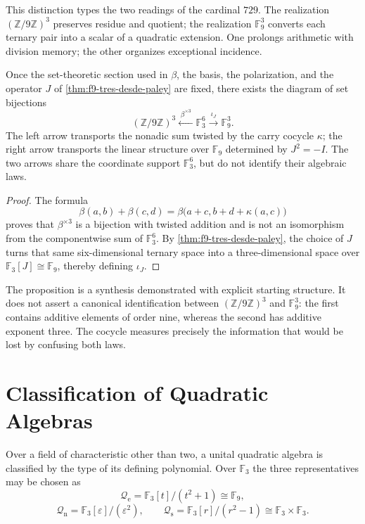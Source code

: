 This distinction types the two readings of the cardinal \(729\). The realization
\((\mathbb Z/9\mathbb Z)^3\) preserves residue and quotient; the realization
\(\mathbb F_9^3\) converts each ternary pair into a scalar of a quadratic
extension. One prolongs arithmetic with division memory; the other
organizes exceptional incidence.

\begin{proposition}
\label{prop:dos-lecturas-tipadas-729}
Once the set-theoretic section used in \(\beta\), the basis, the
polarization, and the operator \(J\) of
\cref{thm:f9-tres-desde-paley} are fixed, there exists the diagram of set bijections
\[
\boxed{
(\mathbb Z/9\mathbb Z)^3
\xleftarrow{\;\beta^{\times3}\;}
\mathbb F_3^6
\xrightarrow{\;\iota_J\;}
\mathbb F_9^3.}
\]
The left arrow transports the nonadic sum twisted by the carry
cocycle \(\kappa\); the right arrow transports the linear structure over
\(\mathbb F_9\) determined by \(J^2=-I\). The two arrows share the
coordinate support \(\mathbb F_3^6\), but do not identify their algebraic
laws.
\end{proposition}

\begin{proof}
The formula
\[
 \beta(a,b)+\beta(c,d)
 =\beta\bigl(a+c,b+d+\kappa(a,c)\bigr)
\]
proves that \(\beta^{\times3}\) is a bijection with twisted addition and is not
an isomorphism from the componentwise sum of
\(\mathbb F_3^6\). By \cref{thm:f9-tres-desde-paley}, the choice of
\(J\) turns that same six-dimensional ternary space into a
three-dimensional space over
\(\mathbb F_3[J]\cong\mathbb F_9\), thereby defining \(\iota_J\).
\end{proof}

The proposition is a synthesis demonstrated with explicit starting structure.
It does not assert a canonical identification between
\((\mathbb Z/9\mathbb Z)^3\) and \(\mathbb F_9^3\): the first contains
additive elements of order nine, whereas the second has additive exponent
three. The cocycle measures precisely the information that would be lost by
confusing both laws.

\section{Classification of Quadratic Algebras}

Over a field of characteristic other than two, a unital quadratic algebra
is classified by the type of its defining polynomial. Over
\(\mathbb F_3\) the three representatives may be chosen as
\[
 \mathcal Q_{\mathrm e}
 =\mathbb F_3[t]/(t^2+1)\cong\mathbb F_9,
\]
\[
 \mathcal Q_{\mathrm n}
 =\mathbb F_3[\varepsilon]/(\varepsilon^2),
 \qquad
 \mathcal Q_{\mathrm s}
 =\mathbb F_3[r]/(r^2-1)
 \cong\mathbb F_3\times\mathbb F_3.
\]

